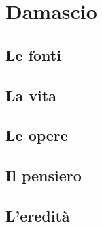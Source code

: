 \chapter{Damascio}

\section{Le fonti}

\section{La vita}

\section{Le opere}

\section{Il pensiero}

\section{L'eredità}
